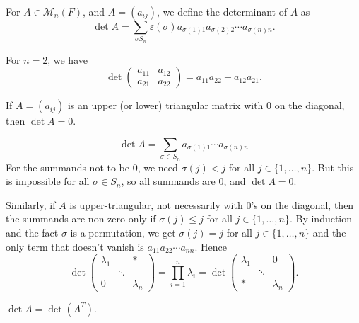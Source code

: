 \documentclass[12pt]{article}
\begin{document}
\begin{definition}
	For $A \in \mathcal{M}_{n}(F)$, and $A = (a_{ij})$, we define the determinant of $A$ as
	\[
		\det A = \sum_{\sigma S_n}\varepsilon(\sigma)a_{\sigma(1) 1} a_{\sigma(2) 2} \cdots a_{\sigma(n) n}
	.\]
\end{definition}

\begin{exbox}
	For $n = 2$, we have
	\[
	\det
	\begin{pmatrix}
		a_{11} & a_{12} \\
		a_{21} & a_{22}
	\end{pmatrix}
	= a_{11}a_{22} - a_{12}a_{21}
	.\]
\end{exbox}

\begin{lemma}
	If $A = (a_{ij})$ is an upper (or lower) triangular matrix with $0$ on the diagonal, then $\det A = 0$.
\end{lemma}

\begin{proofbox}
	\[
		\det A = \sum_{\sigma \in S_n} a_{\sigma(1) 1} \cdots a_{\sigma(n) n}
	\]
	For the summands not to be $0$, we need $\sigma(j) < j$ for all $j \in \{1, \ldots, n\}$. But this is impossible for all $\sigma \in S_n$, so all summands are $0$, and $\det A = 0$.

	Similarly, if $A$ is upper-triangular, not necessarily with $0$'s on the diagonal, then the summands are non-zero only if $\sigma(j) \leq j$ for all $j \in \{1, \ldots, n\}$. By induction and the fact $\sigma$ is a permutation, we get $\sigma(j) = j$ for all $j \in \{1, \ldots, n\}$ and the only term that doesn't vanish is $a_{11}a_{22}\cdots a_{nn}$. Hence
	\[
	\det
	\begin{pmatrix}
		\lambda_1 & & \ast \\
		 & \ddots & \\
		0 &  & \lambda_n
	\end{pmatrix}
	= \prod_{i = 1}^{n} \lambda_i = \det
	\begin{pmatrix}
		\lambda_1 & & 0 \\
			  & \ddots & \\
		\ast & &\lambda_n
	\end{pmatrix}
	.\]
\end{proofbox}

\begin{lemma}
	$\det A = \det(A^{T})$.
\end{lemma}
\end{document}

